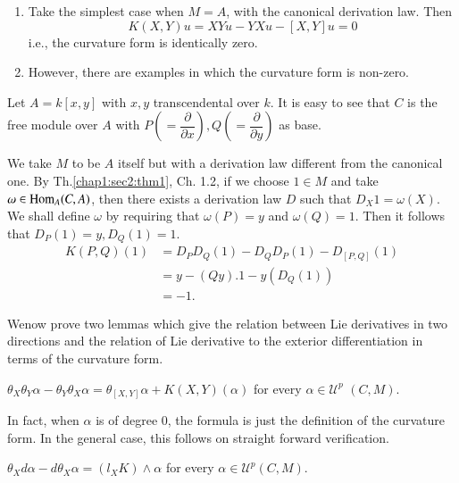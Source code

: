 \begin{examples*}
  \begin{enumerate}[1)]
  \item Take the  simplest case when $ M = A $, with the canonical
    derivation law. Then 
    $$
    K ( X,Y ) u = XYu - YXu - [ X,Y ] u = 0 
    $$
    i.e., the curvature form is identically zero.
  \item However, there are examples in which  the curvature form is non-zero.
  \end{enumerate}
\end{examples*}

Let $ A = k [ x,y ] $ with $ x,y $ transcendental over $k$. It is easy
to see that $C$ is the free module over $A$ with $ P \left( =
\dfrac{\partial}{\partial x} \right) , Q \left( =
\dfrac{\partial}{\partial y} \right) 
$ as base. 

We take $M$ to be $A$ itself but with a derivation law different from
the canonical one. By Th.\ref{chap1:sec2:thm1}, Ch. 1.2, if we choose $ 1 \in M $
and take $ \omega \in \operatorname{Hom}_A ( C,A ) $, then there exists a derivation
law $D$ such that $ D_X 1 = \omega (X) $. We shall define $\omega$ by
requiring that $ \omega (P) = y $ and $ \omega (Q) = 1 $. Then it
follows that $ D_P (1) = y , D_Q (1) = 1 $. 
\begin{align*}
  K ( P,Q )(1) &= D_P D_Q (1) - D_Q D_P (1) - D_{[ P,Q ]} (1) \\
  &= y - ( Q y ). 1 - y ( D_Q ( 1 )) \\
  &= -1.
\end{align*}

We\pageoriginale now prove two lemmas which give the relation between Lie
derivatives in two directions  and the relation of Lie derivative to
the exterior differentiation in terms of the curvature form.  

\begin{lem}\label{chap1:sec9:lem3} %
  $ \theta_X \theta_Y \alpha - \theta_Y \theta_X \alpha = \theta_{[
      X,Y ]}  \alpha + K ( X,Y ) (\alpha)  $ for every  $ \alpha \in
  \mathscr{U}^p$ $( C,M ) $. 
\end{lem}

In fact, when $ \alpha $ is of degree $0$, the formula is just the
definition of the  curvature form. In the general case, this follows
on straight forward  verification.  

\begin{lem}\label{chap1:sec9:lem4} %
  $ \theta_X  d \alpha - d \theta_X \alpha = ( l_X K )  \wedge \alpha
  $ for every $ \alpha \in \mathscr{U}^p ( C, M ) $. 
\end{lem}

